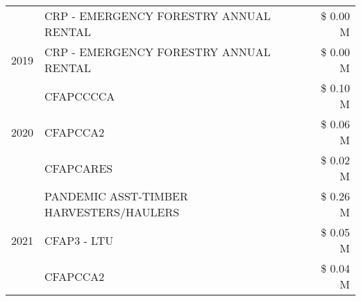 \begin{tabular}{llr}
 & CRP - EMERGENCY FORESTRY ANNUAL RENTAL & \$ 0.00 M \\
\cline{1-3}
2019 & CRP - EMERGENCY FORESTRY ANNUAL RENTAL & \$ 0.00 M \\
\cline{1-3}
\multirow[t]{3}{*}{2020} & CFAPCCCCA & \$ 0.10 M \\
 & CFAPCCA2 & \$ 0.06 M \\
 & CFAPCARES & \$ 0.02 M \\
\cline{1-3}
\multirow[t]{3}{*}{2021} & PANDEMIC ASST-TIMBER HARVESTERS/HAULERS & \$ 0.26 M \\
 & CFAP3 - LTU & \$ 0.05 M \\
 & CFAPCCA2 & \$ 0.04 M \\
\cline{1-3}
\bottomrule
\end{tabular}
